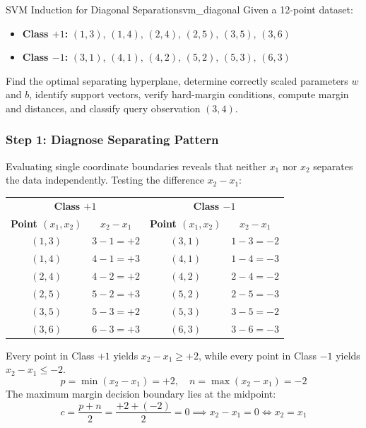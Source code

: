 \begin{example}{SVM Induction for Diagonal Separation}{svm_diagonal}
Given a 12-point dataset:
\begin{itemize}
    \item \textbf{Class $+1$:} $(1, 3),\, (1, 4),\, (2, 4),\, (2, 5),\, (3, 5),\, (3, 6)$
    \item \textbf{Class $-1$:} $(3, 1),\, (4, 1),\, (4, 2),\, (5, 2),\, (5, 3),\, (6, 3)$
\end{itemize}
Find the optimal separating hyperplane, determine correctly scaled parameters $w$ and $b$, identify support vectors, verify hard-margin conditions, compute margin and distances, and classify query observation $(3, 4)$.

\subsubsection{Step 1: Diagnose Separating Pattern}
Evaluating single coordinate boundaries reveals that neither $x_1$ nor $x_2$ separates the data independently. Testing the difference $x_2 - x_1$:

\begin{center}\small
\begin{tabular}{cc|cc}
\toprule
\multicolumn{2}{c|}{\textbf{Class $+1$}} & \multicolumn{2}{c}{\textbf{Class $-1$}} \\
\textbf{Point $(x_1, x_2)$} & $x_2 - x_1$ & \textbf{Point $(x_1, x_2)$} & $x_2 - x_1$ \\
\midrule
$(1, 3)$ & $3 - 1 = +2$ & $(3, 1)$ & $1 - 3 = -2$ \\
$(1, 4)$ & $4 - 1 = +3$ & $(4, 1)$ & $1 - 4 = -3$ \\
$(2, 4)$ & $4 - 2 = +2$ & $(4, 2)$ & $2 - 4 = -2$ \\
$(2, 5)$ & $5 - 2 = +3$ & $(5, 2)$ & $2 - 5 = -3$ \\
$(3, 5)$ & $5 - 3 = +2$ & $(5, 3)$ & $3 - 5 = -2$ \\
$(3, 6)$ & $6 - 3 = +3$ & $(6, 3)$ & $3 - 6 = -3$ \\
\bottomrule
\end{tabular}
\end{center}

Every point in Class $+1$ yields $x_2 - x_1 \ge +2$, while every point in Class $-1$ yields $x_2 - x_1 \le -2$.
\begin{equation}
p = \min(x_2 - x_1) = +2, \quad n = \max(x_2 - x_1) = -2
\end{equation}
The maximum margin decision boundary lies at the midpoint:
\begin{equation}
c = \frac{p + n}{2} = \frac{+2 + (-2)}{2} = 0 \implies x_2 - x_1 = 0 \iff x_2 = x_1
\end{equation}


\end{example}
